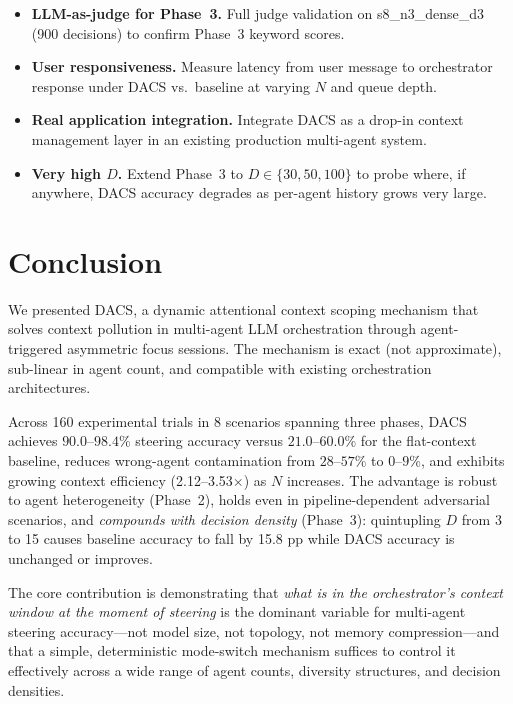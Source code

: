 \documentclass{article}
\begin{document}
\begin{itemize}
  \item \textbf{LLM-as-judge for Phase~3.} Full judge validation on
  s8\_n3\_dense\_d3 (900 decisions) to confirm Phase~3 keyword scores.
  \item \textbf{User responsiveness.} Measure latency from user message
  to orchestrator response under DACS vs.\ baseline at varying $N$ and
  queue depth.
  \item \textbf{Real application integration.} Integrate DACS as a
  drop-in context management layer in an existing production multi-agent
  system.
  \item \textbf{Very high $D$.} Extend Phase~3 to $D \in \{30, 50, 100\}$
  to probe where, if anywhere, DACS accuracy degrades as per-agent
  history grows very large.
\end{itemize}

\section{Conclusion}
\label{sec:conclusion}

We presented DACS, a dynamic attentional context scoping mechanism that
solves context pollution in multi-agent LLM orchestration through
agent-triggered asymmetric focus sessions.
The mechanism is exact (not approximate), sub-linear in agent count, and
compatible with existing orchestration architectures.

Across 160 experimental trials in 8 scenarios spanning three phases,
DACS achieves $90.0$--$98.4\%$ steering accuracy versus $21.0$--$60.0\%$
for the flat-context baseline, reduces wrong-agent contamination from
$28$--$57\%$ to $0$--$9\%$, and exhibits growing context efficiency
(2.12--3.53$\times$) as $N$ increases.
The advantage is robust to agent heterogeneity (Phase~2), holds even in
pipeline-dependent adversarial scenarios, and \emph{compounds with
decision density} (Phase~3): quintupling $D$ from 3 to 15 causes baseline
accuracy to fall by 15.8 pp while DACS accuracy is unchanged or improves.

The core contribution is demonstrating that \emph{what is in the
orchestrator's context window at the moment of steering} is the
dominant variable for multi-agent steering accuracy---not model size,
not topology, not memory compression---and that a simple, deterministic
mode-switch mechanism suffices to control it effectively across a
wide range of agent counts, diversity structures, and decision densities.



\end{document}
